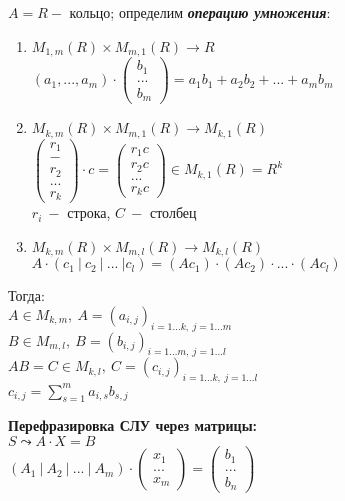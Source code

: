 \begin{definition}
    $A=R-$ кольцо; определим \textbf{\textit{операцию умножения}}:
    \begin{enumerate}
        \item $M_{1,m}(R)\times M_{m,1}(R)\rightarrow R$ \\
         $(a_1,...,a_m)\cdot \begin{pmatrix} b_1\\... \\b_m 
\end{pmatrix}=a_1b_1+a_2b_2+...+a_mb_m$
         \item $M_{k,m}(R)\times M_{m,1}(R)\rightarrow M_{k,1}(R)$ \\
         $\begin{pmatrix} r_1\\-\\r_2 \\... \\r_k \end{pmatrix}\cdot 
c=\begin{pmatrix} r_1c\\r_2c \\... \\r_kc \end{pmatrix}\in M_{k,1}(R)=R^k$ 
\\
        $r_i\ -$ строка, $C\ -$ столбец
        \item $M_{k,m}(R)\times M_{m,l}(R)\rightarrow M_{k,l}(R)$ \\
        $A\cdot(c_1\ |\ c_2\ |\ ...\ |c_l)=(Ac_1)\cdot 
(Ac_2)\cdot...\cdot(Ac_l)$
    \end{enumerate}
    Тогда: \\
    $A\in M_{k,m},\ A=(a_{i,j})_{i=1...k,\ j=1...m}$ \\
    $B\in M_{m,l},\ B=(b_{i,j})_{i=1...m,\ j=1...l}$ \\
    $AB=C\in M_{k,l},\ C=(c_{i,j})_{i=1...k,\ j=1...l}$ \\
    $c_{i,j}=\sum\limits_{s=1}^ma_{i,s}b_{s,j}$
\end{definition}

\begin{statement}
    \textbf{Перефразировка СЛУ через матрицы:} \\
    $S\leadsto A\cdot X=B$ \\
    $(A_1\ |\ A_2\ |\ ...\ |\ A_m)\cdot\begin{pmatrix} x_1\\ ... \\ 
x_m\end{pmatrix}=\begin{pmatrix} b_1\\ ... \\ b_n\end{pmatrix}$
\end{statement}

